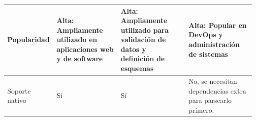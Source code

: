 \begin{longtable}{|p{3cm}|p{4.5cm}|p{5cm}|p{4.5cm}|}
    \hline
    Popularidad             & Alta: Ampliamente utilizado en aplicaciones web y de software         & Alta: Ampliamente utilizado para validación de datos y definición de esquemas                                              & Alta: Popular en DevOps y administración de sistemas                                                        \\
    \hline
    Soporte nativo          & Sí                                                                    & Sí                                                                                                                         & No, se necesitan dependencias extra para parsearlo primero.                                                 \\
    \hline
\end{longtable}
\restoregeometry